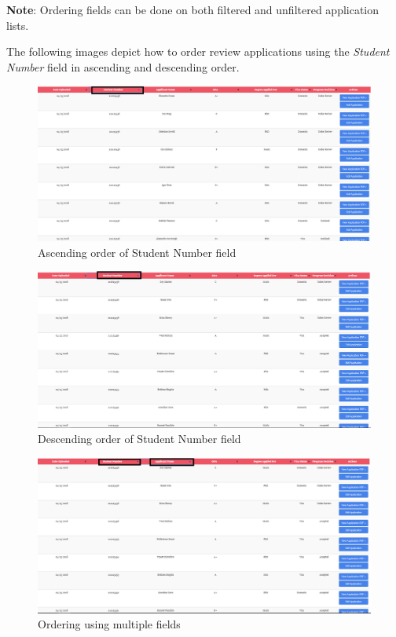 \documentclass[fontsize=12pt,paper=letter,twoside]{scrartcl}
\begin{document}
\bigskip
\noindent \textbf{Note}: Ordering fields can be done on both filtered and unfiltered application lists.

\bigskip
\noindent The following images depict how to order review applications using the \emph{Student Number} field in ascending and descending order.

\begin{figure}[!htb]
\begin{center}
\includegraphics[width=.8\textwidth]{images/adm/ma/order_ascending.png}
\end{center}
\caption{Ascending order of Student Number field}
\label{fig:adm/order_ascending}
\end{figure}

\begin{figure}[!htb]
\begin{center}
\includegraphics[width=.99\textwidth]{images/adm/ma/order_descending.png}
\end{center}
\caption{Descending order of Student Number field}
\label{fig:adm/order_descending}
\end{figure}

\begin{figure}[!htb]
\begin{center}
\includegraphics[width=.99\textwidth]{images/adm/ma/multiple_order.png}
\end{center}
\caption{Ordering using multiple fields}
\label{fig:adm/multiple_order}
\end{figure}
\end{document}
